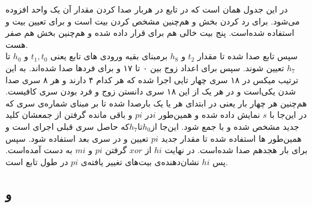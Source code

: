 در این جدول  همان  است که در تابع\hyperref[subsec:skein-big-core]{} در هربار صدا کردن  مقدار آن یک واحد افزوده می‌شود.  برای رد کردن بخش  و هم‌چنین مشخص کردن بیت   است و  برای تعیین بیت  و  استفاده شده‌است. پنج بیت خالی هم برای قرار داده شده و هم‌چنین بخش  هم صفر هست. 
\\
سپس تابع\hyperref[subsec:TFBIG-KINIT]{}
صدا شده تا مقدار $ t_2 $ و $ h_8 $ برمبنای بقیه ورودی های تابع یعنی $ t_1 , t_0 $ و $ h_0 $ تا $ h_7 $ تعیین شوند. سپس برای اعداد زوج بین ۰ تا ۱۷\hyperref[subsec:TFBIG-4e]{} و برای فردها \hyperref[subsec:TFBIG-4o]{} صدا شده‌اند. به این ترتیب میکس در ۱۸ سری چهار تایی اجرا شده که هر کدام ۴  دارند و هر ۸ سری صدا شدن یکی‌است و در هر یک از این ۱۸ سری دانستن زوج و فرد بودن سری کافیست. هم‌چنین هر چهار بار یعنی در ابتدای هر یا یک بار\hyperref[subsec:TFBIG-ADDKEY]{}صدا شده تا بر مبنای شماره‌ی سری که در این‌جا با $ s$ نمایش داده شده و همین‌طور $ i $در $ pi $ و باقی مانده گرفتن از جمعشان کلید جدید مشخص شده و با  جمع شود. این‌جا از$ h_0 $تا$ h_7 $که حاصل سری قبلی اجرای است و همین‌طور  ها استفاده شده تا مقدار جدید $ pi $ تعیین و در سری بعد استفاده شود. سپس برای بار هجدهم  صدا شده‌است. در نهایت $ hi $ از $ xor $ گرفتن $pi $ و $ mi $ به دست ‌آمده‌است. پس ‌‌‌$ hi $ نشان‌دهنده‌ی بیت‌های تغییر یافته‌ی ‌$ pi $ در طول تابع است.


\subsection{و }
\label{subsec:TFBIG-4e}
\label{subsec:TFBIG-4o}

